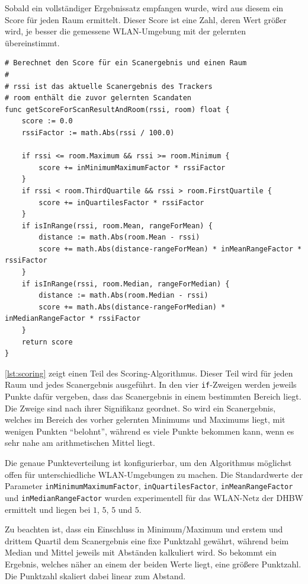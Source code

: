 Sobald ein vollständiger Ergebnissatz empfangen wurde, wird aus diesem ein Score für jeden Raum
ermittelt. Dieser Score ist eine Zahl, deren Wert größer wird, je besser die gemessene
\gls{WLAN}-Umgebung mit der gelernten übereinstimmt.

\begin{lstlisting}[caption={Pseudocode-Beschreibung der Scoring-Funktion},label={lst:scoring},tabsize=2]
# Berechnet den Score für ein Scanergebnis und einen Raum
#
# rssi ist das aktuelle Scanergebnis des Trackers
# room enthält die zuvor gelernten Scandaten
func getScoreForScanResultAndRoom(rssi, room) float {
	score := 0.0
	rssiFactor := math.Abs(rssi / 100.0)

	if rssi <= room.Maximum && rssi >= room.Minimum {
		score += inMinimumMaximumFactor * rssiFactor
	}
	if rssi < room.ThirdQuartile && rssi > room.FirstQuartile {
		score += inQuartilesFactor * rssiFactor
	}
	if isInRange(rssi, room.Mean, rangeForMean) {
		distance := math.Abs(room.Mean - rssi)
		score += math.Abs(distance-rangeForMean) * inMeanRangeFactor * rssiFactor
	}
	if isInRange(rssi, room.Median, rangeForMedian) {
		distance := math.Abs(room.Median - rssi)
		score += math.Abs(distance-rangeForMedian) * inMedianRangeFactor * rssiFactor
	}
	return score
}
\end{lstlisting}

\autoref{lst:scoring} zeigt einen Teil des Scoring-Algorithmus. Dieser Teil wird für jeden Raum und
jedes Scanergebnis ausgeführt. In den vier \texttt{if}-Zweigen werden jeweils Punkte dafür vergeben,
dass das Scanergebnis in einem bestimmten Bereich liegt. Die Zweige sind nach ihrer Signifikanz
geordnet. So wird ein Scanergebnis, welches im Bereich des vorher gelernten Minimums und Maximums
liegt, mit wenigen Punkten \enquote{belohnt}, während es viele Punkte bekommen kann, wenn es sehr
nahe am arithmetischen Mittel liegt.

Die genaue Punkteverteilung ist konfigurierbar, um den Algorithmus möglichst offen für
unterschiedliche \gls{WLAN}-Umgebungen zu machen. Die Standardwerte der Parameter
\texttt{inMinimumMaximumFactor}, \texttt{inQuartilesFactor}, \texttt{inMeanRangeFactor} und
\texttt{inMedianRangeFactor} wurden experimentell für das \gls{WLAN}-Netz der \gls{DHBW} ermittelt und liegen
bei $1$, $5$, $5$ und $5$.

Zu beachten ist, dass ein Einschluss in Minimum/Maximum und erstem und drittem Quartil dem
Scanergebnis eine fixe Punktzahl gewährt, während beim Median und Mittel jeweils mit Abständen
kalkuliert wird. So bekommt ein Ergebnis, welches näher an einem der beiden Werte liegt, eine
größere Punktzahl. Die Punktzahl skaliert dabei linear zum Abstand.

